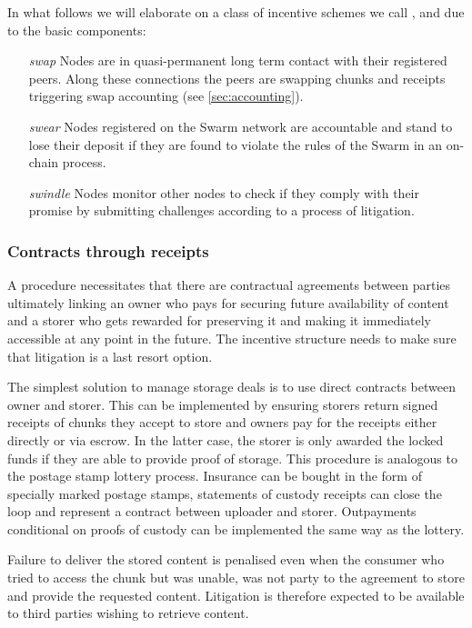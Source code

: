In what follows we will elaborate on a class of incentive schemes we call ,  and  due to the basic components:

\begin{itemize}
\item [\emph{swap}]
  Nodes are in quasi-permanent long term contact with their registered peers. Along these connections the peers are swapping chunks and receipts triggering swap accounting (see \ref{sec:accounting}).
  
\item [\emph{swear}]
  Nodes registered on the Swarm network are accountable and stand to lose their deposit if they are found to violate the rules of the Swarm in an on-chain  process.

\item [\emph{swindle}]
  Nodes monitor other nodes to check if they comply with their promise by submitting challenges according to a process of litigation.

\end{itemize}

\subsubsection{Contracts through receipts}

A  procedure necessitates that there are contractual agreements between parties ultimately linking an owner who pays for securing future availability of content and a storer who gets rewarded for preserving it and making it immediately accessible at any point in the future. The incentive structure needs to make sure that litigation is a last resort option.

The simplest solution to manage storage deals is to use direct contracts between owner and storer. This can be implemented by ensuring storers return signed receipts of chunks they accept to store and owners pay for the receipts either directly or via escrow. In the latter case, the storer is only awarded the locked funds if they are able to provide proof of storage. This procedure is analogous to the postage stamp lottery process. Insurance can be bought in the form of specially marked postage stamps, statements of custody receipts can close the loop and represent a contract between uploader and storer. Outpayments conditional on proofs of custody can be implemented the same way as the lottery.

Failure to deliver the stored content is penalised even when the consumer who tried to access the chunk but was unable, was not party to the agreement to store and provide the requested content. Litigation is therefore expected to be available to third parties wishing to retrieve content.

